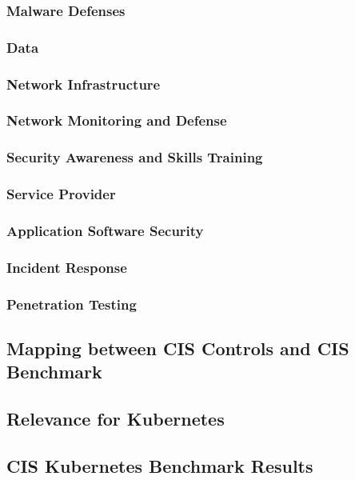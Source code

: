 \subsubsection{Malware Defenses}

\subsubsection{Data}

\subsubsection{Network Infrastructure}

\subsubsection{Network Monitoring and Defense}

\subsubsection{Security Awareness and Skills Training}

\subsubsection{Service Provider}

\subsubsection{Application Software Security}

\subsubsection{Incident Response}

\subsubsection{Penetration Testing}

\subsection{Mapping between CIS Controls and CIS Benchmark}

\subsection{Relevance for Kubernetes}

\subsection{CIS Kubernetes Benchmark Results}
